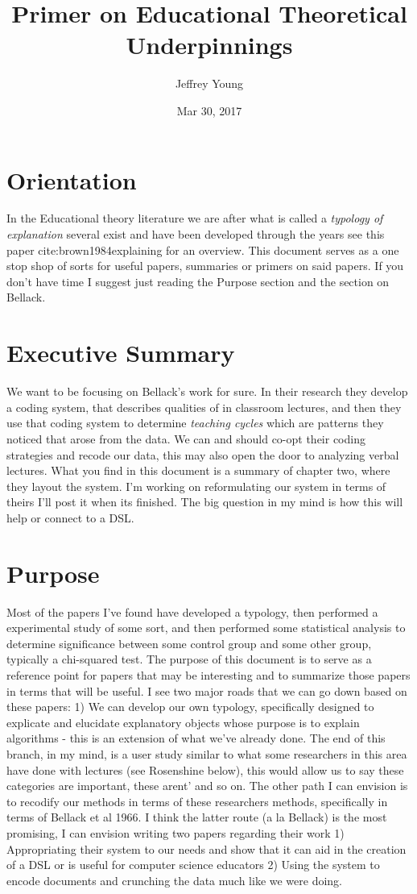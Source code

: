 \documentclass[10pt, letterpaper]{article}
\author{Jeffrey Young}
\date{Mar 30, 2017}
\title{Primer on Educational Theoretical Underpinnings}
\begin{document}
\maketitle

\section*{Orientation}
\label{sec:orgda5377e}
In the Educational theory literature we are after what is called a \emph{typology of explanation} several exist and have been developed through the years see this paper cite:brown1984explaining for an overview. This document serves as a one stop shop of sorts for useful papers, summaries or primers on said papers. If you don't have time I suggest just reading the Purpose section and the section on Bellack.
\section*{Executive Summary}
\label{sec:org6616844}
We want to be focusing on Bellack's work for sure. In their research they develop a coding system, that describes qualities of in classroom lectures, and then they use that coding system to determine \emph{teaching cycles} which are patterns they noticed that arose from the data. We can and should co-opt their coding strategies and recode our data, this may also open the door to analyzing verbal lectures. What you find in this document is a summary of chapter two, where they layout the system. I'm working on reformulating our system in terms of theirs I'll post it when its finished. The big question in my mind is how this will help or connect to a DSL.

\section*{Purpose}
\label{sec:orgfb70c14}
Most of the papers I've found have developed a typology, then performed a experimental study of some sort, and then performed some statistical analysis to determine significance between some control group and some other group, typically a chi-squared test. The purpose of this document is to serve as a reference point for papers that may be interesting and to summarize those papers in terms that will be useful. I see two major roads that we can go down based on these papers: 1) We can develop our own typology, specifically designed to explicate and elucidate explanatory objects whose purpose is to explain algorithms - this is an extension of what we've already done. The end of this branch, in my mind, is a user study similar to what some researchers in this area have done with lectures (see Rosenshine below), this would allow us to say these categories are important, these arent' and so on. The other path I can envision is to recodify our methods in terms of these researchers methods, specifically in terms of Bellack et al 1966. I think the latter route (a la Bellack) is the most promising, I can envision writing two papers regarding their work 1) Appropriating their system to our needs and show that it can aid in the creation of a DSL or is useful for computer science educators 2) Using the system to encode documents and crunching the data much like we were doing.
\end{document}
